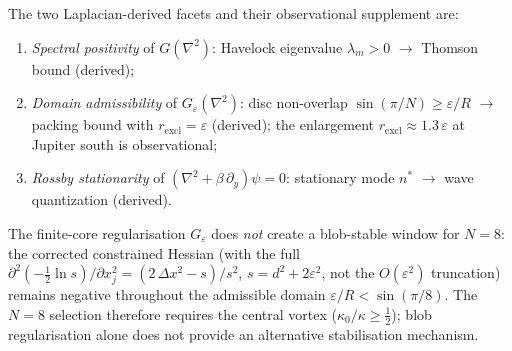 \begin{remark}
The two Laplacian-derived facets and their observational supplement are:
\begin{enumerate}
  \item \emph{Spectral positivity} of $G(\nabla^2)$: Havelock
    eigenvalue $\lambda_m > 0$ $\to$ Thomson bound (derived);
  \item \emph{Domain admissibility} of $G_\varepsilon(\nabla^2)$:
    disc non-overlap $\sin(\pi/N) \ge \varepsilon/R$ $\to$ packing
    bound with $r_{\mathrm{excl}} = \varepsilon$ (derived);
    the enlargement $r_{\mathrm{excl}} \approx 1.3\,\varepsilon$
    at Jupiter south is observational;
  \item \emph{Rossby stationarity} of $(\nabla^2 + \beta\,\partial_y)\psi = 0$:
    stationary mode $n^*$ $\to$ wave quantization (derived).
\end{enumerate}
The finite-core regularisation $G_\varepsilon$ does \emph{not} create
a blob-stable window for $N = 8$: the corrected constrained Hessian
(with the full $\partial^2(-\tfrac12\ln s)/\partial x_j^2
= (2\,\Delta x^2 - s)/s^2$, $s = d^2 + 2\varepsilon^2$, not
the $O(\varepsilon^2)$ truncation) remains negative throughout
the admissible domain $\varepsilon/R < \sin(\pi/8)$.
The $N = 8$ selection therefore requires the central vortex
($\kappa_0/\kappa \ge \tfrac{1}{2}$); blob regularisation alone
does not provide an alternative stabilisation mechanism.
\end{remark}

